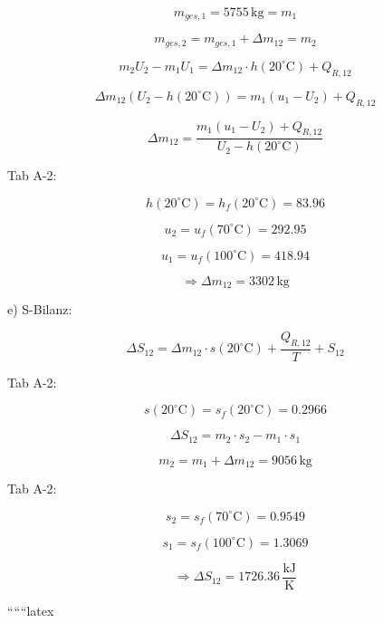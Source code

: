 \[
m_{ges,1} = 5755 \, \text{kg} = m_1
\]

\[
m_{ges,2} = m_{ges,1} + \Delta m_{12} = m_2
\]

\[
m_2 U_2 - m_1 U_1 = \Delta m_{12} \cdot h(20^\circ \text{C}) + Q_{R,12}
\]

\[
\Delta m_{12} (U_2 - h(20^\circ \text{C})) = m_1 (u_1 - U_2) + Q_{R,12}
\]

\[
\Delta m_{12} = \frac{m_1 (u_1 - U_2) + Q_{R,12}}{U_2 - h(20^\circ \text{C})}
\]

Tab A-2:

\[
h(20^\circ \text{C}) = h_f(20^\circ \text{C}) = 83.96
\]

\[
u_2 = u_f(70^\circ \text{C}) = 292.95
\]

\[
u_1 = u_f(100^\circ \text{C}) = 418.94
\]

\[
\Rightarrow \Delta m_{12} = 3302 \, \text{kg}
\]

e) S-Bilanz:

\[
\Delta S_{12} = \Delta m_{12} \cdot s(20^\circ \text{C}) + \frac{Q_{R,12}}{T} + S_{12}
\]

Tab A-2:

\[
s(20^\circ \text{C}) = s_f(20^\circ \text{C}) = 0.2966
\]

\[
\Delta S_{12} = m_2 \cdot s_2 - m_1 \cdot s_1
\]

\[
m_2 = m_1 + \Delta m_{12} = 9056 \, \text{kg}
\]

Tab A-2:

\[
s_2 = s_f(70^\circ \text{C}) = 0.9549
\]

\[
s_1 = s_f(100^\circ \text{C}) = 1.3069
\]

\[
\Rightarrow \Delta S_{12} = 1726.36 \, \frac{\text{kJ}}{\text{K}}
\]

``````latex


